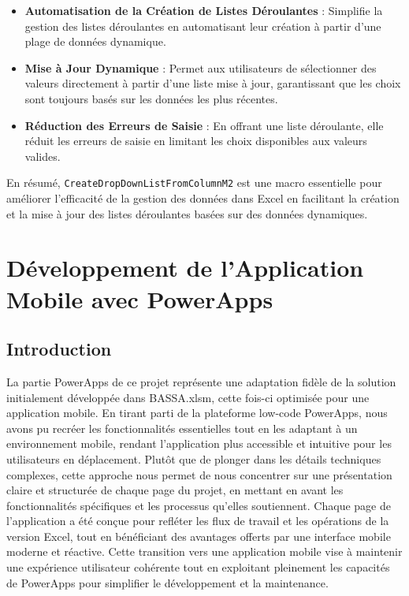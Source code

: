 \documentclass[a4paper, oneside, 12pt, final]{extreport}
\begin{document}
\begin{itemize}
    \item \textbf{Automatisation de la Création de Listes Déroulantes} : Simplifie la gestion des listes déroulantes en automatisant leur création à partir d'une plage de données dynamique.
    \item \textbf{Mise à Jour Dynamique} : Permet aux utilisateurs de sélectionner des valeurs directement à partir d'une liste mise à jour, garantissant que les choix sont toujours basés sur les données les plus récentes.
    \item \textbf{Réduction des Erreurs de Saisie} : En offrant une liste déroulante, elle réduit les erreurs de saisie en limitant les choix disponibles aux valeurs valides.
\end{itemize}

En résumé, \texttt{CreateDropDownListFromColumnM2} est une macro essentielle pour améliorer l'efficacité de la gestion des données dans Excel en facilitant la création et la mise à jour des listes déroulantes basées sur des données dynamiques.
\part{Développement de l'Application Mobile avec PowerApps  }
\chapter{Introduction}
La partie PowerApps de ce projet représente une adaptation fidèle de la solution initialement développée dans BASSA.xlsm, cette fois-ci optimisée pour une application mobile. En tirant parti de la plateforme low-code PowerApps, nous avons pu recréer les fonctionnalités essentielles tout en les adaptant à un environnement mobile, rendant l'application plus accessible et intuitive pour les utilisateurs en déplacement. Plutôt que de plonger dans les détails techniques complexes, cette approche nous permet de nous concentrer sur une présentation claire et structurée de chaque page du projet, en mettant en avant les fonctionnalités spécifiques et les processus qu'elles soutiennent. Chaque page de l'application a été conçue pour refléter les flux de travail et les opérations de la version Excel, tout en bénéficiant des avantages offerts par une interface mobile moderne et réactive. Cette transition vers une application mobile vise à maintenir une expérience utilisateur cohérente tout en exploitant pleinement les capacités de PowerApps pour simplifier le développement et la maintenance.
\end{document}
